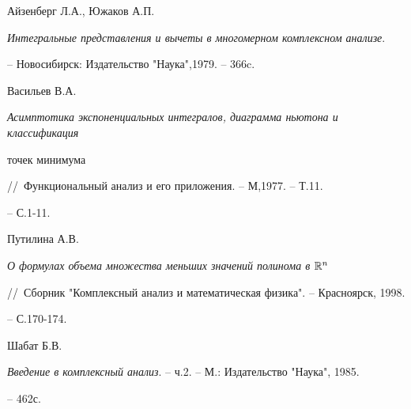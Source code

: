 \vskip 2cm












\label{end}











 {\sc Айзенберг Л.А., Южаков А.П.}


{\it Интегральные представления и вычеты в многомерном комплексном анализе}.


-- Новосибирск: Издательство "Наука",1979. -- 366c.





 {\sc Васильев В.А.}


{\it Асимптотика экспоненциальных интегралов, диаграмма ньютона и классификация


точек минимума}//~Функциональный анализ и его приложения. -- М,1977. -- Т.11.


-- С.1-11.





 {\sc Путилина А.В.}


{\it О формулах объема множества меньших значений полинома в ${\Bbb R}^n$}


//~Сборник "Комплексный анализ и математическая физика". -- Красноярск, 1998.


-- С.170-174.





 {\sc Шабат Б.В.}


{\it Введение в комплексный анализ}. -- ч.2. -- М.: Издательство "Наука", 1985.


-- 462с.


